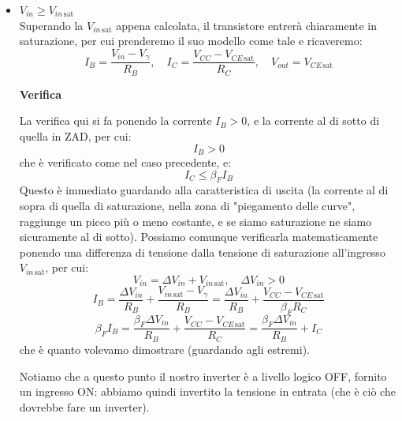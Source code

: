 \documentclass[a4paper,11pt]{article}
\begin{document}
\begin{itemize}
Si deve quindi verificare che la $V_{CE}$ sia maggiore della tensione di saturazione, cioè:
$$
V_{CE} > V_{CE \, \mathrm{sat}}
$$
Questa ipotesi è verificata finché scegliamo una $V_{in \, \mathrm{sat}}$ che la rispetti. Calcoliamone quindi il valore, ponendo:
$$
V_{CE \, \mathrm{sat}} = V_{CC} - \frac{R_C \beta_F}{R_B} ( V_{in \, \mathrm{sat}} - V_\gamma ) \implies V_{in \, \mathrm{sat}} = V_\gamma + \frac{R_B}{R_C \beta_F} ( V_{CC} - V_{CE \, \mathrm{sat}} )
$$

\item $V_{in} \geq V_{in \, \mathrm{sat}}$ \\

Superando la $V_{in \, \mathrm{sat}}$ appena calcolata, il transistore entrerà chiaramente in saturazione, per cui prenderemo il suo modello come tale e ricaveremo:
$$
I_B = \frac{V_{in} - V_\gamma}{R_B}, \quad I_C = \frac{V_{CC} - V_{CE \, \mathrm{sat}}}{R_C}, \quad V_{out} = V_{CE \, \mathrm{sat}}
$$

\par\smallskip

\noindent
\textbf{\textsf{Verifica}}

\noindent
La verifica qui si fa ponendo la corrente $I_B > 0$, e la corrente al di sotto di quella in ZAD, per cui:
$$
I_B > 0
$$
che è verificato come nel caso precedente, e:
$$
I_C \leq \beta_F I_B
$$
Questo è immediato guardando alla caratteristica di uscita (la corrente al di sopra di quella di saturazione, nella zona di "piegamento delle curve", raggiunge un picco più o meno costante, e se siamo saturazione ne siamo sicuramente al di sotto). 
Possiamo comunque verificarla matematicamente ponendo una differenza di tensione dalla tensione di saturazione all'ingresso $V_{in \, \mathrm{sat}}$, per cui:
\[
	V_{in} = \Delta V_{in} + V_{in \, \mathrm{sat}}, \quad \Delta V_{in} > 0
\]
\[
	I_B = \frac{\Delta V_{in}}{R_B} + \frac{V_{in \, \mathrm{sat}} - V_\gamma}{R_B}
	= \frac{\Delta V_{in}}{R_B} + \frac{V_{CC} - V_{CE\,\mathrm{sat}}}{\beta_F R_C}
\]
\[
\beta_F I_B
= \frac{\beta_F \Delta V_{in}}{R_B} + \frac{V_{CC} - V_{CE\,\mathrm{sat}}}{R_C}
= \frac{\beta_F \Delta V_{in}}{R_B} + I_C
\]
che è quanto volevamo dimostrare (guardando agli estremi).

\par\smallskip

Notiamo che a questo punto il nostro inverter è a livello logico OFF, fornito un ingresso ON: abbiamo quindi invertito la tensione in entrata (che è ciò che dovrebbe fare un inverter). 

\end{itemize}
\end{document}
